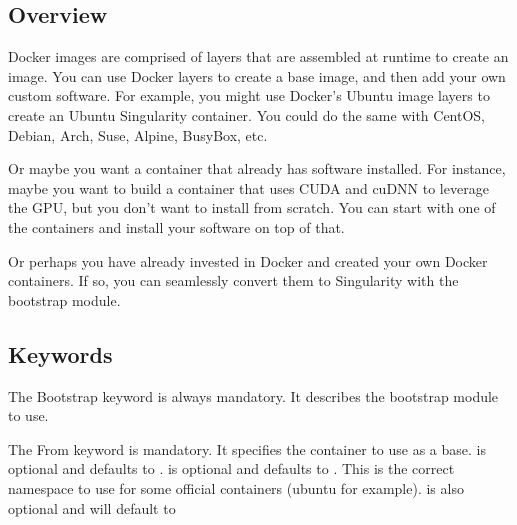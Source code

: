 \documentclass[letterpaper,10pt,english]{sphinxmanual}
\begin{document}
\subsection{Overview}
\label{\detokenize{appendix:overview}}\label{\detokenize{appendix:sec-build-docker-module}}
Docker images are comprised of layers that are assembled at runtime to create an image. You can use Docker layers to create a base
image, and then add your own custom software. For example, you might use Docker’s Ubuntu image layers to create an Ubuntu Singularity
container. You could do the same with CentOS, Debian, Arch, Suse, Alpine, BusyBox, etc.

Or maybe you want a container that already has software installed. For instance, maybe you want to build a container that uses CUDA
and cuDNN to leverage the GPU, but you don’t want to install from scratch. You can start with one of the  containers and
install your software on top of that.

Or perhaps you have already invested in Docker and created your own Docker containers. If so, you can seamlessly convert them to
Singularity with the  bootstrap module.


\subsection{Keywords}
\label{\detokenize{appendix:keywords}}
%
\begin{sphinxVerbatim}[commandchars=\\\{\}]
 
\end{sphinxVerbatim}

The Bootstrap keyword is always mandatory. It describes the bootstrap module to use.

%
\begin{sphinxVerbatim}[commandchars=\\\{\}]
 
\end{sphinxVerbatim}

The From keyword is mandatory. It specifies the container to use as a base.  is optional and defaults to .
 is optional and defaults to . This is the correct namespace to use for some official containers (ubuntu for example).
 is also optional and will default to 
\end{document}
